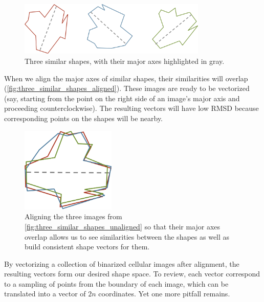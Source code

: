 \begin{figure}[h]
\centering
\mySfFamily
\includegraphics[width = 0.8\textwidth]{../images/three_similar_shapes_unaligned.png}
\caption{Three similar shapes, with their major axes highlighted in gray.}
\label{fig:three_similar_shapes_unaligned}
\end{figure}

When we align the major axes of similar shapes, their similarities will overlap (\autoref{fig:three_similar_shapes_aligned}). These images are ready to be vectorized (say, starting from the point on the right side of an image's major axis and proceeding counterclockwise). The resulting vectors will have low RMSD because corresponding points on the shapes will be nearby.

\begin{figure}[h]
\centering
\mySfFamily
\includegraphics[width = 0.4\textwidth]{../images/three_similar_shapes_aligned.png}
\caption{Aligning the three images from \autoref{fig:three_similar_shapes_unaligned} so that their major axes overlap allows us to see similarities between the shapes as well as build consistent shape vectors for them.}
\label{fig:three_similar_shapes_aligned}
\end{figure}

\begin{note}\end{note}

By vectorizing a collection of binarized cellular images after alignment, the resulting vectors form our desired shape space. To review, each vector correspond to a sampling of  points from the boundary of each image, which can be translated into a vector of $2n$ coordinates. Yet one more pitfall remains.\\


